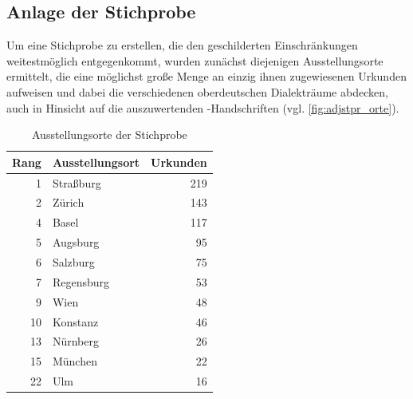 \subsection{Anlage der Stichprobe}
\label{subsec:cao_sample}

Um eine Stichprobe zu erstellen, die den geschilderten Einschränkungen
weitestmöglich entgegenkommt, wurden zunächst diejenigen Ausstellungs\-orte
ermittelt, die eine möglichst große Menge an einzig ihnen zugewiesenen Urkunden
aufweisen und dabei die verschiedenen oberdeutschen Dialekt\-räume abdecken,
auch in Hinsicht auf die auszuwertenden \KC{}-Handschriften (vgl.
\cref{fig:adjstpr_orte}).

\begin{table}
\centering
\caption{Ausstellungs\-orte der Stichprobe}
\begin{tabular}{r l r}
\toprule
Rang
	& Ausstellungs\-ort
	& Urkunden
	\\

\midrule

 1 & Straßburg  & 219 \\
 2 & Zürich     & 143 \\
 4 & Basel      & 117 \\
 5 & Augsburg   &  95 \\
 6 & Salzburg   &  75 \\
 7 & Regensburg &  53 \\
 9 & Wien       &  48 \\
10 & Konstanz	&  46 \\

\midrule

13 & Nürnberg   &  26 \\
15 & München    &  22 \\
22 & Ulm        &  16 \\

\bottomrule
\end{tabular}
\label{tab:adjstpr_orte}
\end{table}

